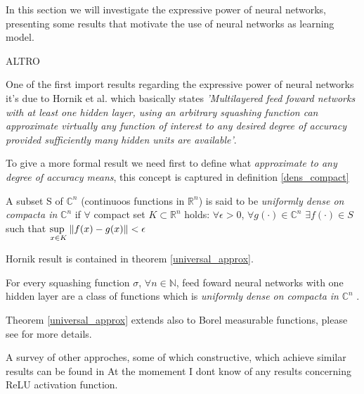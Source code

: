 In this section we will investigate the expressive power of neural networks, presenting some results that motivate the use of neural networks as learning
model. 

ALTRO
 

One of the first import results regarding the expressive power of neural networks it's due to Hornik et al. \cite{Hornik89} which basically states
\textit{'Multilayered feed foward networks with at least one hidden layer, using an arbitrary squashing function can approximate virtually any function
of interest to any desired degree of accuracy provided sufficiently many hidden units are available'}.

To give a more formal result we need first to define what \textit{approximate to any degree of accuracy means}, this concept is captured in definition
\ref{dens_compact}
 
\begin{defn}
 A subset S of $\mathbb{C}^n$ (continuoos functions in $\mathbb{R}^n$) is said to be \textit{uniformly dense on compacta in} $\mathbb{C}^n$ if $\forall$
 compact set $K\subset \mathbb{R}^n$ holds: $\forall \epsilon >0$, $\forall g(\cdot) \in \mathbb{C}^n$ $\exists f(\cdot) \in S$ such that 
 $\underset{x \in K}{\text{sup  }} \left\Vert f(x)-g(x) \right\Vert<\epsilon$ 
 \label{dens_compact}
\end{defn}

Hornik result is contained in theorem \ref{universal_approx}.
\begin{thm}
 For every squashing function $\sigma$, $\forall n\in \mathbb{N}$, feed foward neural
 networks with one hidden layer are a class of functions which is \textit{uniformly dense on compacta in} $\mathbb{C}^n$
\label{universal_approx}.
\end{thm}

Theorem \ref{universal_approx} extends also to Borel measurable functions, please see \cite{Hornik89} for more details.

A survey of other approches, some of which constructive, which achieve similar results can be found in \cite{Scarselli98}
At the momement I dont know of any results concerning ReLU activation function.

